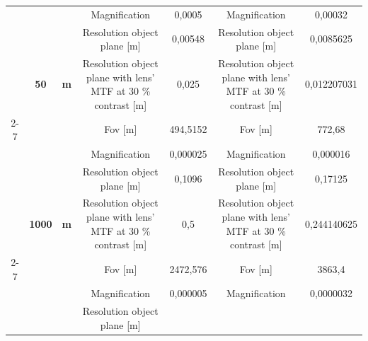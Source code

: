 \begin{table}[H]
{\begin{tabular}{ccc|cc|cc|}
\multicolumn{1}{|c|}{} &
  \cellcolor[HTML]{EFEFEF} &
  \cellcolor[HTML]{EFEFEF} &
  Magnification &
  0,0005 &
  Magnification &
  0,00032 \\
\multicolumn{1}{|c|}{} &
  \cellcolor[HTML]{EFEFEF} &
  \cellcolor[HTML]{EFEFEF} &
  \cellcolor[HTML]{EFEFEF}Resolution object plane {[}m{]} &
  \cellcolor[HTML]{EFEFEF}0,00548 &
  \cellcolor[HTML]{EFEFEF}Resolution object plane {[}m{]} &
  \cellcolor[HTML]{EFEFEF}0,0085625 \\
\multicolumn{1}{|c|}{} &
  \multirow{-4}{*}{\cellcolor[HTML]{EFEFEF}\textbf{50}} &
  \multirow{-4}{*}{\cellcolor[HTML]{EFEFEF}\textbf{m}} &
  Resolution object plane with lens' MTF at 30 \% contrast {[}m{]} &
  0,025 &
  Resolution object plane with lens' MTF at 30 \% contrast {[}m{]} &
  0,012207031 \\ \cline{2-7} 
\multicolumn{1}{|c|}{} &
  \cellcolor[HTML]{EFEFEF} &
  \cellcolor[HTML]{EFEFEF} &
  \cellcolor[HTML]{EFEFEF}Fov {[}m{]} &
  \cellcolor[HTML]{EFEFEF}494,5152 &
  \cellcolor[HTML]{EFEFEF}Fov {[}m{]} &
  \cellcolor[HTML]{EFEFEF}772,68 \\
\multicolumn{1}{|c|}{} &
  \cellcolor[HTML]{EFEFEF} &
  \cellcolor[HTML]{EFEFEF} &
  Magnification &
  0,000025 &
  Magnification &
  0,000016 \\
\multicolumn{1}{|c|}{} &
  \cellcolor[HTML]{EFEFEF} &
  \cellcolor[HTML]{EFEFEF} &
  \cellcolor[HTML]{EFEFEF}Resolution object plane {[}m{]} &
  \cellcolor[HTML]{EFEFEF}0,1096 &
  \cellcolor[HTML]{EFEFEF}Resolution object plane {[}m{]} &
  \cellcolor[HTML]{EFEFEF}0,17125 \\
\multicolumn{1}{|c|}{} &
  \multirow{-4}{*}{\cellcolor[HTML]{EFEFEF}\textbf{1000}} &
  \multirow{-4}{*}{\cellcolor[HTML]{EFEFEF}\textbf{m}} &
  Resolution object plane with lens' MTF at 30 \% contrast {[}m{]} &
  0,5 &
  Resolution object plane with lens' MTF at 30 \% contrast {[}m{]} &
  0,244140625 \\ \cline{2-7} 
\multicolumn{1}{|c|}{} &
  \cellcolor[HTML]{EFEFEF} &
  \cellcolor[HTML]{EFEFEF} &
  \cellcolor[HTML]{EFEFEF}Fov {[}m{]} &
  \cellcolor[HTML]{EFEFEF}2472,576 &
  \cellcolor[HTML]{EFEFEF}Fov {[}m{]} &
  \cellcolor[HTML]{EFEFEF}3863,4 \\
\multicolumn{1}{|c|}{} &
  \cellcolor[HTML]{EFEFEF} &
  \cellcolor[HTML]{EFEFEF} &
  Magnification &
  0,000005 &
  Magnification &
  0,0000032 \\
\multicolumn{1}{|c|}{} &
  \cellcolor[HTML]{EFEFEF} &
  \cellcolor[HTML]{EFEFEF} &
  \cellcolor[HTML]{EFEFEF}Resolution object plane {[}m{]} &

\end{tabular}}
\end{table}
